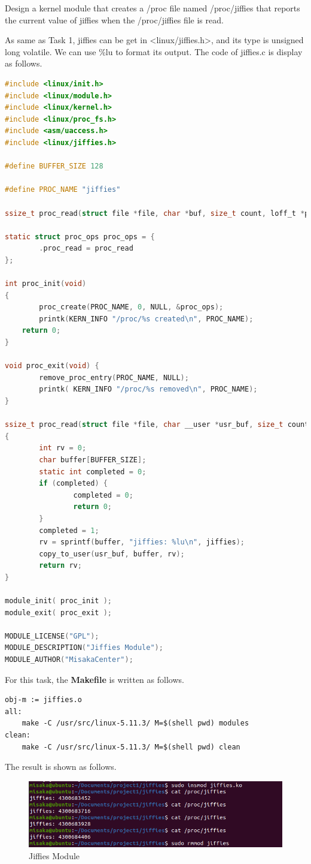 \documentclass[UTF8,10pt,a4paper]{article}
\theoremstyle{Problem}
\theoremstyle{Solution}
\begin{document}
Design a kernel module that creates a /proc file named /proc/jiffies that reports the current value of jiffies when the /proc/jiffies file is read.

As same as Task 1, jiffies can be get in <linux/jiffies.h>, and its type is unsigned long volatile. We can use \%lu to format its output. The code of jiffies.c is display as follows.
\begin{lstlisting}[language = c]
#include <linux/init.h>
#include <linux/module.h>
#include <linux/kernel.h>
#include <linux/proc_fs.h>
#include <asm/uaccess.h>
#include <linux/jiffies.h>

#define BUFFER_SIZE 128

#define PROC_NAME "jiffies"

ssize_t proc_read(struct file *file, char *buf, size_t count, loff_t *pos);

static struct proc_ops proc_ops = {
        .proc_read = proc_read
};

int proc_init(void)
{
        proc_create(PROC_NAME, 0, NULL, &proc_ops);
        printk(KERN_INFO "/proc/%s created\n", PROC_NAME);
	return 0;
}

void proc_exit(void) {
        remove_proc_entry(PROC_NAME, NULL);
        printk( KERN_INFO "/proc/%s removed\n", PROC_NAME);
}

ssize_t proc_read(struct file *file, char __user *usr_buf, size_t count, loff_t *pos)
{
        int rv = 0;
        char buffer[BUFFER_SIZE];
        static int completed = 0;
        if (completed) {
                completed = 0;
                return 0;
        }
        completed = 1;
        rv = sprintf(buffer, "jiffies: %lu\n", jiffies);
        copy_to_user(usr_buf, buffer, rv);
        return rv;
}

module_init( proc_init );
module_exit( proc_exit );

MODULE_LICENSE("GPL");
MODULE_DESCRIPTION("Jiffies Module");
MODULE_AUTHOR("MisakaCenter");
\end{lstlisting}


For this task, the \textbf{Makefile} is written as follows.
\begin{lstlisting}
obj-m := jiffies.o
all:
	make -C /usr/src/linux-5.11.3/ M=$(shell pwd) modules
clean:
	make -C /usr/src/linux-5.11.3/ M=$(shell pwd) clean
\end{lstlisting}

The result is shown as follows.
\begin{figure}[H]
    \centering
    \includegraphics[width=380pt]{jiff.png}
    \caption{Jiffies Module}
    \label{7223}
\end{figure}
\end{document}

